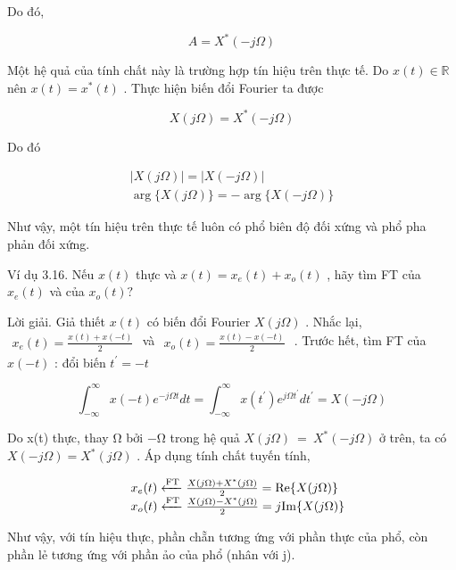 \documentclass[
  10
]{article}
\begin{document}
Do đó,

\[
A = X ^ {*} (- j \Omega)
\]

Một hệ quả của tính chất này là trường hợp tín hiệu trên thực tế. Do
\(x ( t ) \in \mathbb { R }\) nên \(x ( t ) = x ^ { * } ( t )\) . Thực
hiện biến đổi Fourier ta được

\[
X (j \Omega) = X ^ {*} (- j \Omega)
\]

Do đó

\[
\begin{array}{c} | X (j \Omega) | = | X (- j \Omega) | \\ \arg \{X (j \Omega) \} = - \arg \{X (- j \Omega) \} \end{array}
\]

Như vậy, một tín hiệu trên thực tế luôn có phổ biên độ đối xứng và phổ
pha phản đối xứng.

Ví dụ 3.16. Nếu \(x ( t )\) thực và
\(x ( t ) = x _ { e } ( t ) + x _ { o } ( t )\) , hãy tìm FT của
\(x _ { e } ( t )\) và của \(x _ { o } ( t ) ?\)

Lời giải. Giả thiết \(x ( t )\) có biến đổi Fourier \(X ( j \Omega )\) .
Nhắc lại,
\(\begin{array} { r } { x _ { e } ( t ) = \frac { x ( t ) + x ( - t ) } { 2 } } \end{array}\)
và
\(\begin{array} { r } { x _ { o } ( t ) = \frac { x ( t ) - x ( - t ) } { 2 } } \end{array}\)
. Trước hết, tìm FT của \(x ( - t )\) : đổi biến
\(t ^ { \prime } = - t\)

\[
\int_ {- \infty} ^ {\infty} x (- t) e ^ {- j \Omega t} d t = \int_ {- \infty} ^ {\infty} x (t ^ {\prime}) e ^ {j \Omega t ^ {\prime}} d t ^ {\prime} = X (- j \Omega)
\]

Do x(t) thực, thay Ω bởi −Ω trong hệ quả
\(X ( j \Omega ) ~ = ~ X ^ { * } ( - j \Omega )\) ở trên, ta có
\(X ( - j \Omega ) = X ^ { \ast } ( j \Omega )\) . Áp dụng tính chất
tuyến tính,

\[
\begin{array}{r l} & x _ {e} (t) \xleftarrow {\mathrm{FT}} \frac {X (j \Omega) + X ^ {*} (j \Omega)}{2} = \mathrm{Re} \{X (j \Omega) \} \\ & x _ {o} (t) \xleftarrow {\mathrm{FT}} \frac {X (j \Omega) - X ^ {*} (j \Omega)}{2} = j \mathrm{Im} \{X (j \Omega) \} \end{array}
\]

Như vậy, với tín hiệu thực, phần chẵn tương ứng với phần thực của phổ,
còn phần lẻ tương ứng với phần ảo của phổ (nhân với j). 
\end{document}
